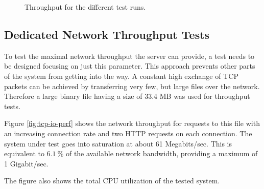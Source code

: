 \begin{figure}[H]
	\centering
  \caption{Throughput for the different test runs.}
  \label{fig:initial-req-io}
\end{figure}

\subsection{Dedicated Network Throughput Tests}

To test the maximal network throughput the server can provide, a test needs to be designed focusing on just this parameter. This approach prevents other parts of the system from getting into the way. A constant high exchange of TCP packets can be achieved by transferring very few, but large files over the network. Therefore a large binary file having a size of 33.4 MB was used for throughput tests.

Figure \ref{fig:tcp-io-perf} shows the network throughput for requests to this file with an increasing connection rate and two HTTP requests on each connection. The system under test goes into saturation at about 61 Megabits/sec. This is equivalent to $6.1\ \%$ of the available network bandwidth, providing a maximum of 1 Gigabit/sec.

The figure also shows the total CPU utilization of the tested system.

